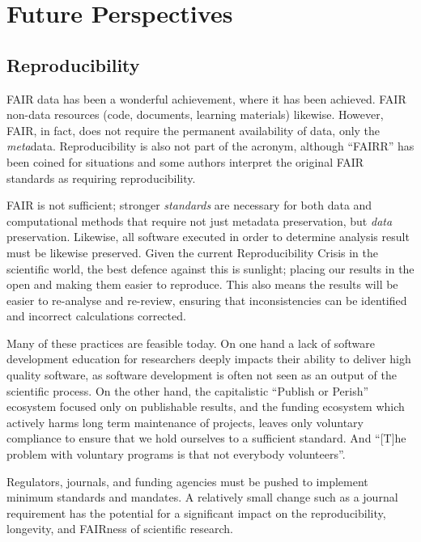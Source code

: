 \section{Future Perspectives}

\subsection{Reproducibility}

FAIR data has been a wonderful achievement, where it has been achieved. FAIR non-data resources (code, documents, learning materials) likewise. However, FAIR, in fact, does not require the permanent availability of data, only the \emph{meta}data. Reproducibility is also not part of the acronym, although ``FAIRR'' has been coined for situations and some authors interpret the original FAIR standards as requiring reproducibility\cite{Lamprecht_2020}. %

FAIR is not sufficient; stronger \emph{standards} are necessary for both data and computational methods that require not just metadata preservation, but \emph{data} preservation. Likewise, all software executed in order to determine analysis result must be likewise preserved. Given the current Reproducibility Crisis in the scientific world\cite{Baker_2016}, the best defence against this is sunlight; placing our results in the open and making them easier to reproduce. This also means the results will be easier to re-analyse and re-review, ensuring that inconsistencies can be identified and incorrect calculations corrected.

Many of these practices are feasible today. On one hand a lack of software development education for researchers deeply impacts their ability to deliver high quality software, as software development is often not seen as an output of the scientific process. On the other hand, the capitalistic ``Publish or Perish'' ecosystem focused only on publishable results, and the funding ecosystem which actively harms long term maintenance of projects, leaves only voluntary compliance to ensure that we hold ourselves to a sufficient standard. And ``[T]he problem with voluntary programs is that not everybody volunteers''\cite{csb-safety}.

Regulators, journals, and funding agencies must be pushed to implement minimum standards and mandates. A relatively small change such as a journal requirement has the potential for a significant impact on the reproducibility, longevity, and FAIRness of scientific research.

